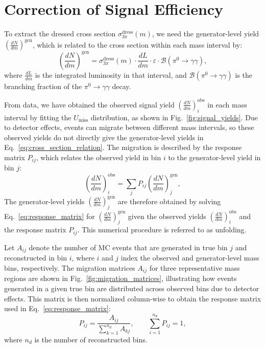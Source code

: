 \clearpage
\section{Correction of Signal Efficiency}

To extract the dressed cross section $\sigma_{3\pi}^{\text{dress}}(m)$, we need
the generator-level yield $\left( \frac{dN}{dm} \right)^{\text{gen}}$, which is
related to the cross section within each mass interval by:
\begin{equation}
    \left( \frac{dN}{dm} \right)^{\text{gen}} = \sigma_{3\pi}^{\text{dress}}(m) \cdot \frac{dL}{dm} \cdot \varepsilon \cdot \mathcal{B}(\pi^0 \to \gamma\gamma),
    \label{eq:cross_section_relation}
\end{equation}
where $\frac{dL}{dm}$ is the integrated luminosity in that interval, and $\mathcal{B}(\pi^0 \to \gamma\gamma)$ is the branching fraction of the $\pi^0 \to \gamma\gamma$ decay.

From data, we have obtained the observed signal yield $\left( \frac{dN}{dm}
    \right)_{i}^{\text{obs}}$ in each mass interval by fitting the
$U_{\text{miss}}$ distribution, as shown in Fig.~\ref{fig:signal_yields}. Due
to detector effects, events can migrate between different mass intervals, so
these observed yields do not directly give the generator-level yields in
Eq.~\eqref{eq:cross_section_relation}. The migration is described by the
response matrix $P_{ij}$, which relates the observed yield in bin $i$ to the
generator-level yield in bin $j$:
\begin{equation}
    \left( \frac{dN}{dm} \right)_{i}^{\text{obs}} = \sum_{j} P_{ij} \left( \frac{dN}{dm} \right)_{j}^{\text{gen}},
    \label{eq:response_matrix}
\end{equation}
The generator-level yields \(\left( \frac{dN}{dm}
\right)_{j}^{\text{gen}}\) are therefore obtained by solving Eq.~\eqref{eq:response_matrix}
for \(\left( \frac{dN}{dm} \right)_{j}^{\text{gen}}\) given the observed yields
\(\left( \frac{dN}{dm} \right)_{i}^{\text{obs}}\) and the response matrix
\(P_{ij}\). This numerical procedure is referred to as unfolding.

Let $A_{ij}$ denote the number of MC events that are generated in true bin $j$
and reconstructed in bin $i$, where $i$ and $j$ index the observed and
generator-level mass bins, respectively. The migration matrices $A_{ij}$ for
three representative mass regions are shown in
Fig.~\ref{fig:migration_matrices}, illustrating how events generated in a given
true bin are distributed across observed bins due to detector effects. This
matrix is then normalized column-wise to obtain the response matrix used in
Eq.~\eqref{eq:response_matrix}:
\begin{equation}
    P_{ij} = \frac{A_{ij}}{\sum_{k=1}^{n_d} A_{kj}}, \qquad \sum_{i=1}^{n_d} P_{ij} = 1,
    \label{eq:response_matrix_norm}
\end{equation}
where $n_d$ is the number of reconstructed bins.

